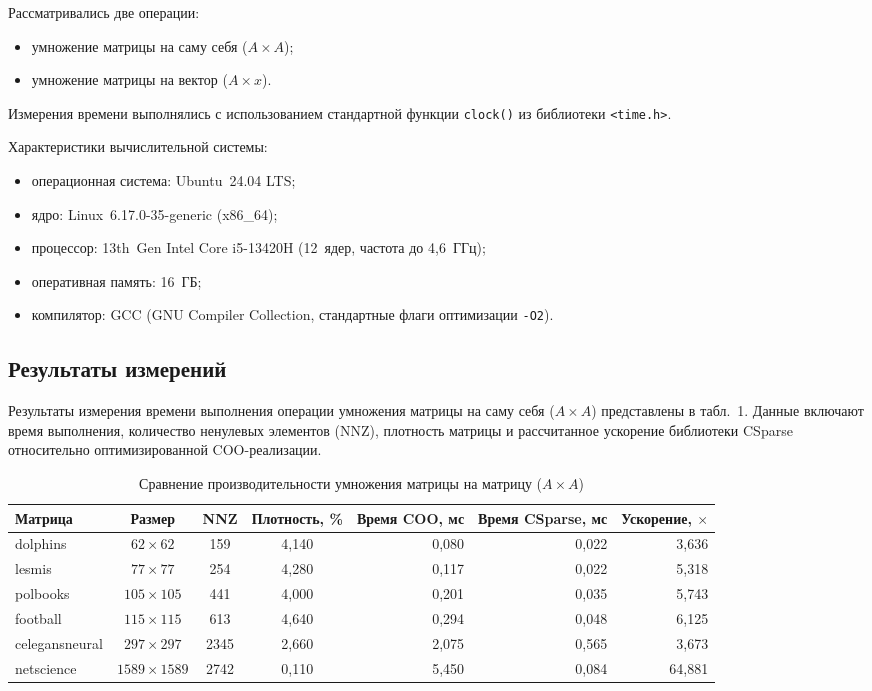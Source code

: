 \documentclass[a4paper]{article}
\begin{document}
Рассматривались две операции:
\begin{itemize}
    \item умножение матрицы на саму себя ($A \times A$);
    \item умножение матрицы на вектор ($A \times x$).
\end{itemize}

Измерения времени выполнялись с использованием стандартной функции \texttt{clock()} из библиотеки \texttt{<time.h>}.

Характеристики вычислительной системы:
\begin{itemize}
    \item операционная система: Ubuntu~24.04 LTS;
    \item ядро: Linux~6.17.0-35-generic (x86\_64);
    \item процессор: 13th~Gen Intel Core i5-13420H (12~ядер, частота до 4,6~ГГц);
    \item оперативная память: 16~ГБ;
    \item компилятор: GCC (GNU Compiler Collection, стандартные флаги оптимизации \texttt{-O2}).
\end{itemize}

\subsection{Результаты измерений}

Результаты измерения времени выполнения операции умножения матрицы на саму себя ($A \times A$) представлены в табл.~1. Данные включают время выполнения, количество ненулевых элементов (NNZ), плотность матрицы и рассчитанное ускорение библиотеки CSparse относительно оптимизированной COO-реализации.

\begin{table}[H]
\centering
\small
\caption{Сравнение производительности умножения матрицы на матрицу ($A \times A$)}
\label{tab:mat_mult_combined}
\begin{tabular}{l c c c r r r}
\toprule
Матрица & Размер & NNZ & Плотность, \% & Время COO, мс & Время CSparse, мс & Ускорение, $\times$ \\
\midrule
dolphins & $62 \times 62$ & 159 & 4,140 & 0,080 & 0,022 & 3,636 \\
lesmis & $77 \times 77$ & 254 & 4,280 & 0,117 & 0,022 & 5,318 \\
polbooks & $105 \times 105$ & 441 & 4,000 & 0,201 & 0,035 & 5,743 \\
football & $115 \times 115$ & 613 & 4,640 & 0,294 & 0,048 & 6,125 \\
celegansneural & $297 \times 297$ & 2345 & 2,660 & 2,075 & 0,565 & 3,673 \\
netscience & $1589 \times 1589$ & 2742 & 0,110 & 5,450 & 0,084 & 64,881 \\
\bottomrule
\end{tabular}
\end{table}
\end{document}
